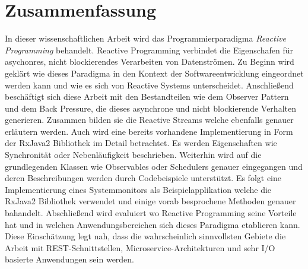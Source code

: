 \pagestyle{empty} %
\cleardoublepage

\section*{Zusammenfassung} %
\label{cha:zusammenfassung}
In dieser wissenschaftlichen Arbeit wird das Programmierparadigma \textit{Reactive Programming} behandelt. Reactive Programming verbindet die Eigenschafen für asychonres, nicht blockierendes Verarbeiten von Datenströmen. Zu Beginn wird geklärt wie dieses Paradigma in den Kontext der Softwareentwicklung eingeordnet werden kann und wie es sich von Reactive Systems unterscheidet. Anschließend beschäftigt sich diese Arbeit mit den Bestandteilen wie dem Observer Pattern und dem Back Pressure, die dieses asynchrone und nicht blockierende Verhalten generieren. Zusammen bilden sie die Reactive Streams welche ebenfalls genauer erläutern werden. Auch wird eine bereits vorhandene Implementierung in Form der RxJava2 Bibliothek im Detail betrachtet. Es werden Eigenschaften wie Synchronität oder Nebenläufigkeit beschrieben. Weiterhin wird auf die grundlegenden Klassen wie Observables oder Schedulers genauer eingegangen und deren Beschreibungen werden durch Codebeispiele unterstützt. Es folgt eine Implementierung eines Systemmonitors als Beispielapplikation welche die RxJava2 Bibliothek verwendet und einige vorab besprochene Methoden genauer bahandelt. Abschließend wird evaluiert wo Reactive Programming seine Vorteile hat und in welchen Anwendungsbereichen sich dieses Paradigma etablieren kann. Diese Einschätzung legt nah, dass die wahrscheinlich sinnvollsten Gebiete die Arbeit mit REST-Schnittstellen, Microservice-Architekturen und sehr I/O basierte Anwendungen sein werden.

\vspace*{1,5cm}
